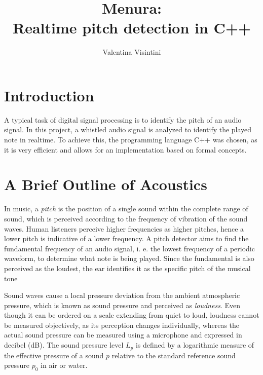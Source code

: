 \documentclass[runningheads,a4paper]{llncs}
\begin{document}
\mainmatter  %

\title{Menura: \\ Realtime pitch detection in C++}


%
\author{Valentina Visintini}
%


\maketitle


\section{Introduction}
A typical task of digital signal processing is to identify the pitch of an audio signal. In this project, a whistled audio signal is analyzed to identify the played note in realtime. To achieve this, the programming language C++ was chosen, as it is very efficient and allows for an implementation based on formal concepts.


\section{A Brief Outline of Acoustics}
In music, a \textit{pitch} is the position of a single sound within the complete range of sound, which is perceived according to the frequency of vibration of the sound waves. Human listeners perceive higher frequencies as higher pitches, hence a lower pitch is indicative of a lower frequency.
A pitch detector aims to find the fundamental frequency of an audio signal, i. e. the lowest frequency of a periodic waveform, to determine what note is being played. Since the fundamental is also perceived as the loudest, the ear identifies it as the specific pitch of the musical tone

Sound waves cause a local pressure deviation from the ambient atmospheric pressure, which is known as sound pressure and perceived as \textit{loudness}. Even though it can be ordered on a scale extending from quiet to loud, loudness cannot be measured objectively, as its perception changes individually, whereas the actual sound pressure can be measured using a microphone and expressed in decibel (dB). The sound pressure level $L_p$ is defined by a logarithmic measure of the effective pressure of a sound $p$ relative to the standard reference sound pressure $p_0$ in air or water. 
\end{document}
